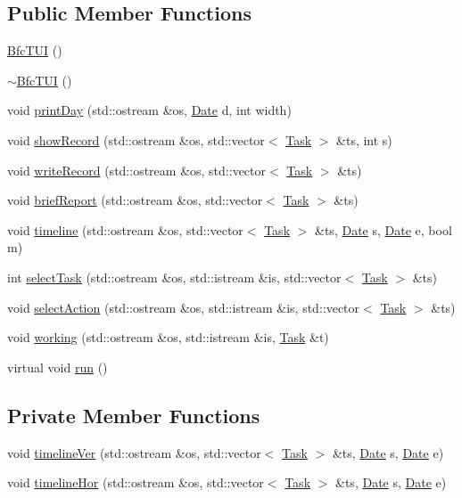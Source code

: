 \subsection*{Public Member Functions}
\begin{DoxyCompactItemize}
\item 
\hyperlink{classBfcTUI_aec4a74685e13990672018efe38f63cd8}{Bfc\-T\-U\-I} ()
\item 
\hyperlink{classBfcTUI_adff8e447a86fd73ead506f7d4da38646}{$\sim$\-Bfc\-T\-U\-I} ()
\item 
void \hyperlink{classBfcTUI_a4034a1a0e50d24ca3da16683ca7a0bd1}{print\-Day} (std\-::ostream \&os, \hyperlink{classDate}{Date} d, int width)
\item 
void \hyperlink{classBfcTUI_a50402f167049c054ba2512374e7e0b03}{show\-Record} (std\-::ostream \&os, std\-::vector$<$ \hyperlink{classTask}{Task} $>$ \&ts, int s)
\item 
void \hyperlink{classBfcTUI_a1c446b91f4f250d4b4f5f255e207c88e}{write\-Record} (std\-::ostream \&os, std\-::vector$<$ \hyperlink{classTask}{Task} $>$ \&ts)
\item 
void \hyperlink{classBfcTUI_a5577e09a7a8b9df3d4ab1edf8bcdd5f4}{brief\-Report} (std\-::ostream \&os, std\-::vector$<$ \hyperlink{classTask}{Task} $>$ \&ts)
\item 
void \hyperlink{classBfcTUI_a816b7be298cd8f33001748f1d54b4297}{timeline} (std\-::ostream \&os, std\-::vector$<$ \hyperlink{classTask}{Task} $>$ \&ts, \hyperlink{classDate}{Date} s, \hyperlink{classDate}{Date} e, bool m)
\item 
int \hyperlink{classBfcTUI_a65e27dcfe8f631a0cccabc86e206ecd6}{select\-Task} (std\-::ostream \&os, std\-::istream \&is, std\-::vector$<$ \hyperlink{classTask}{Task} $>$ \&ts)
\item 
void \hyperlink{classBfcTUI_aaef01dfab9df0cceb7bffb86ceff396d}{select\-Action} (std\-::ostream \&os, std\-::istream \&is, std\-::vector$<$ \hyperlink{classTask}{Task} $>$ \&ts)
\item 
void \hyperlink{classBfcTUI_a46768f66e08bd343d562eb6cfac1d497}{working} (std\-::ostream \&os, std\-::istream \&is, \hyperlink{classTask}{Task} \&t)
\item 
virtual void \hyperlink{classBfcTUI_a3cbe28345432cfc02537f879be1b2395}{run} ()
\end{DoxyCompactItemize}
\subsection*{Private Member Functions}
\begin{DoxyCompactItemize}
\item 
void \hyperlink{classBfcTUI_a3803d34ecb5b2e8389a04bd07cc55d3c}{timeline\-Ver} (std\-::ostream \&os, std\-::vector$<$ \hyperlink{classTask}{Task} $>$ \&ts, \hyperlink{classDate}{Date} s, \hyperlink{classDate}{Date} e)
\item 
void \hyperlink{classBfcTUI_aeddc5da12ada09fa9e4bbb7f135bdda9}{timeline\-Hor} (std\-::ostream \&os, std\-::vector$<$ \hyperlink{classTask}{Task} $>$ \&ts, \hyperlink{classDate}{Date} s, \hyperlink{classDate}{Date} e)
\end{DoxyCompactItemize}
